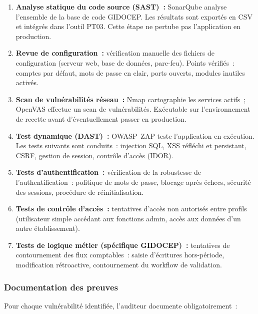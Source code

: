 \documentclass[12pt,a4paper,oneside]{report}
\begin{document}
\begin{enumerate}[leftmargin=*, itemsep=4pt]
\item \textbf{Analyse statique du code source (SAST)~:} SonarQube analyse
  l'ensemble de la base de code GIDOCEP. Les r\'esultats sont export\'es en
  CSV et int\'egr\'es dans l'outil PT03. Cette \'etape ne pertube pas
  l'application en production.

\item \textbf{Revue de configuration~:} v\'erification manuelle des fichiers
  de configuration (serveur web, base de donn\'ees, pare-feu). Points v\'erifi\'es~:
  comptes par d\'efaut, mots de passe en clair, ports ouverts, modules
  inutiles activ\'es.

\item \textbf{Scan de vuln\'erabilit\'es r\'eseau~:} Nmap cartographie les
  services actifs~; OpenVAS effectue un scan de vuln\'erabilit\'es. Ex\'ecutable
  sur l'environnement de recette avant d'\'eventuellement passer en production.

\item \textbf{Test dynamique (DAST)~:} OWASP~ZAP teste l'application en
  ex\'ecution. Les tests suivants sont conduits~: injection SQL, XSS r\'efl\'echi
  et persistant, CSRF, gestion de session, contr\^ole d'acc\`es (IDOR).

\item \textbf{Tests d'authentification~:} v\'erification de la robustesse
  de l'authentification~: politique de mots de passe, blocage apr\`es \'echecs,
  s\'ecurit\'e des sessions, proc\'edure de r\'einitialisation.

\item \textbf{Tests de contr\^ole d'acc\`es~:} tentatives d'acc\`es non
  autoris\'es entre profils (utilisateur simple accédant aux fonctions admin,
  acc\`es aux donn\'ees d'un autre \'etablissement).

\item \textbf{Tests de logique m\'etier (sp\'ecifique GIDOCEP)~:} tentatives de
  contournement des flux comptables~: saisie d'\'ecritures hors-p\'eriode,
  modification r\'etroactive, contournement du workflow de validation.
\end{enumerate}

\subsubsection{Documentation des preuves}

Pour chaque vuln\'erabilit\'e identifi\'ee, l'auditeur documente obligatoirement~:
\end{document}
